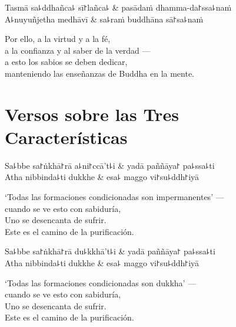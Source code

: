 \begin{twochants}
  Tasmā sa꜕ddhañca꜕ sī꜓lañca꜕ & pasādaṁ dhamma-da꜓ssa꜕naṁ \\
  A꜕nuyuñjetha medhāvī & sa꜕raṁ buddhāna sā꜓sa꜕naṁ \\
\end{twochants}

\begin{english}
  Por ello, a la virtud y a la fé,\\
  a la confianza y al saber de la verdad ---\\
  a esto los sabios se deben dedicar,\\
  manteniendo las enseñanzas de Buddha en la mente.
\end{english}

\chapter{Versos sobre las Tres Características}


\begin{leader}
\end{leader}

\begin{twochants}
  Sa꜕bbe sa꜓ṅkhā꜓rā a꜕ni꜓ccā't꜕i & yadā paññāya꜓ pa꜕ssa꜕ti \\
  Atha nibbinda꜕ti dukkhe & esa꜕ maggo vi꜓su꜕ddh꜓iyā \\
\end{twochants}

\begin{english}
  `Todas las formaciones condicionadas son impermanentes' ---\\
  cuando se ve esto con sabiduría,\\
  Uno se desencanta de sufrir.\\
  Este es el camino de la purificación.
\end{english}

\begin{twochants}
  Sa꜕bbe sa꜓ṅkhā꜓rā du꜕kkhā't꜕i & yadā paññāya꜓ pa꜕ssa꜕ti \\
  Atha nibbinda꜕ti dukkhe & esa꜕ maggo vi꜓su꜕ddh꜓iyā \\
\end{twochants}

\begin{english}
  `Todas las formaciones condicionadas son dukkha' ---\\
  cuando se ve esto con sabiduría,\\
  Uno se desencanta de sufrir.\\
  Este es el camino de la purificación.
\end{english}

